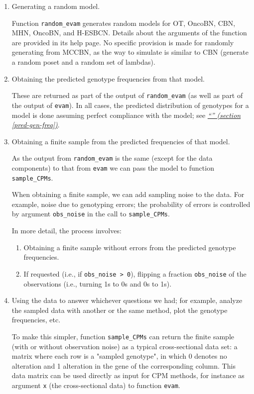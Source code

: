 \documentclass[a4paper,11pt]{article}
\newcommand*{\qref}[1]{\hyperref[{#1}]{\textit{``\nameref*{#1}'' (section \ref*{#1})}}}
\begin{document}
\begin{enumerate}
\item Generating a random model.
  
  Function \texttt{random\_evam} generates random models for OT, OncoBN, CBN, MHN, OncoBN, and H-ESBCN. Details about the arguments of the function are provided in its help page. No specific provision is made for randomly generating from MCCBN, as the way to simulate is similar to CBN (generate a random poset and a random set of lambdas).

\item Obtaining the predicted genotype frequencies from that model.
  
  These are returned as part of the output of \texttt{random\_evam} (as well as part of the output of \texttt{evam}). In all cases, the predicted distribution of genotypes for a model is done assuming perfect compliance with the model; see \qref{pred-gen-freq}.

\item Obtaining a finite sample from the predicted frequencies of that model.

  As the output from \texttt{random\_evam} is the same (except for the data components) to that from \texttt{evam} we can pass the model to function \texttt{sample\_CPMs}.

  When obtaining a finite sample, we can add sampling noise to the data. For example, noise due to genotyping errors; the probability of errors is controlled by argument \texttt{obs\_noise} in the call to \texttt{sample\_CPMs}.

  In more detail, the process involves:
  \begin{enumerate}
  \item Obtaining a finite sample without errors from the predicted genotype frequencies.
  \item If requested (i.e., if \texttt{obs\_noise > 0}), flipping a fraction \texttt{obs\_noise} of the observations (i.e., turning 1s to 0s and 0s to 1s).
  \end{enumerate}
  
\item Using the data to answer whichever questions we had; for example, analyze the sampled data with another or the same method, plot the genotype frequencies, etc.

  To make this simpler, function \texttt{sample\_CPMs} can return the finite sample (with or without observation noise) as a typical cross-sectional data set: a matrix where each row is a "sampled genotype", in which 0 denotes no alteration and 1 alteration in the gene of the corresponding column. This data matrix can be used directly as input for CPM methods, for instance as argument \texttt{x} (the cross-sectional data) to function \texttt{evam}.

  
\end{enumerate}
\end{document}
